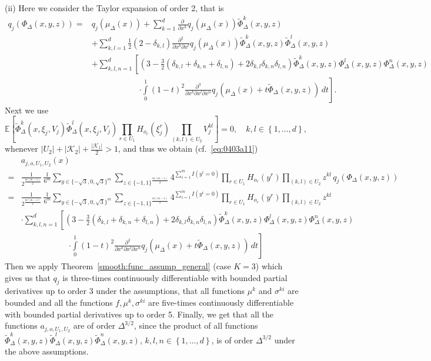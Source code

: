 \documentclass[11pt,a4paper]{amsart}
\theoremstyle{plain}
\theoremstyle{definition}
\theoremstyle{remark}
\numberwithin{equation}{section}
\newcommand*{\EE}{\mathbb E}
\begin{document}
(ii) Here we consider the Taylor expansion of order 2, that is
\begin{align*}
q_j(\Phi_\Delta(x,y,z))=&q_j(\mu_\Delta(x))+\sum_{k=1}^d\frac{\partial}{\partial x^k}q_j(\mu_\Delta(x))\tilde\Phi_\Delta^k(x,y,z)\\
&+\sum_{k,l=1}^d\frac{1}{2}(2-\delta_{k,l})\frac{\partial^2}{\partial x^k\partial x^l}q_j(\mu_\Delta(x))\tilde\Phi_\Delta^k(x,y,z)\tilde\Phi_\Delta^l(x,y,z)\\
&+\sum_{k,l,n=1}^d\left[\left(3-\frac{3}{2}\left(\delta_{k,l}+\delta_{k,n}+\delta_{l,n}\right)+2\delta_{k,l}\delta_{k,n}\delta_{l,n}\right)\tilde\Phi_\Delta^k(x,y,z)\Phi_\Delta^l(x,y,z)\Phi_\Delta^n(x,y,z)\right.\\
&\phantom{+\sum_{k,l,n=1}^d\left[\right.}\left.
\cdot\int\limits_0^1(1-t)^2\frac{\partial^3}{\partial x^k\partial x^l\partial x^n}q_j(\mu_\Delta(x)+t\tilde\Phi_\Delta(x,y,z))\,dt\right].
\end{align*}
Next we use 
$$\EE\left[\tilde\Phi_\Delta^k(x,\xi_j,V_j)\tilde\Phi_\Delta^l(x,\xi_j,V_j)\prod_{r\in U_1} H_{o_r}(\xi_j^r)
\prod_{(k,l)\in U_2} V_j^{kl}\right]=0,\quad k,l\in\left\{1,\ldots,d\right\},$$
whenever $\left|U_2\right|+\left|\mathcal{K}_2\right|+\frac{\left|\mathcal{K}_1\right|}{2}>1$, and thus we obtain (cf.~\eqref{eq:0403a11})
\begin{align*}
&a_{j,o,U_1,U_2}(x)\\
=&\frac{1}{2^{\frac{m(m-1)}{2}}}\,\frac{1}{6^{m}}\sum_{y\in\{-\sqrt{3},0,\sqrt{3}\}^{m}}\sum_{z\in\{-1,1\}^{\frac{m(m-1)}{2}}} 4^{\sum_{i=1}^{m}I(y^{i}=0)}
\prod_{r\in U_1}H_{o_r}(y^r)
\prod_{(k,l)\in U_2}z^{kl}\,
q_j(\Phi_\Delta(x,y,z))\\
=&\frac{1}{2^{\frac{m(m-1)}{2}}}\,\frac{1}{6^{m}}\sum_{y\in\{-\sqrt{3},0,\sqrt{3}\}^{m}}\sum_{z\in\{-1,1\}^{\frac{m(m-1)}{2}}} 4^{\sum_{i=1}^{m}I(y^{i}=0)}
\prod_{r\in U_1}H_{o_r}(y^r)
\prod_{(k,l)\in U_2}z^{kl}\\
&\cdot\sum_{k,l,n=1}^d\left[\left(3-\frac{3}{2}\left(\delta_{k,l}+\delta_{k,n}+\delta_{l,n}\right)+2\delta_{k,l}\delta_{k,n}\delta_{l,n}\right)\tilde\Phi_\Delta^k(x,y,z)\Phi_\Delta^l(x,y,z)\Phi_\Delta^n(x,y,z)\right.\\
&\phantom{+\sum_{k,l,n=1}^d\left[\right.}\left.
\cdot\int\limits_0^1(1-t)^2\frac{\partial^3}{\partial x^k\partial x^l\partial x^n}q_j(\mu_\Delta(x)+t\tilde\Phi_\Delta(x,y,z))\,dt\right]
\end{align*}
Then we apply Theorem~\ref{smooth:func_assump_general} (case $K=3$) which gives us that $q_j$ is three-times continuously differentiable with bounded partial derivatives up to order 3 under the assumptions, that all functions $\mu^k$ and $\sigma^{ki}$ are bounded and all the functions $f,\mu^k,\sigma^{ki}$ are five-times continuously differentiable with bounded partial derivatives up to order 5. Finally, we get that all the functions $a_{j,o,U_1,U_2}$ are of order $\Delta^{3/2}$, since the product of all functions $\tilde\Phi_\Delta^k(x,y,z)\tilde\Phi_\Delta^l(x,y,z)\tilde\Phi_\Delta^n(x,y,z)$, $k,l,n\in\left\{1,\ldots,d\right\}$, is of order $\Delta^{3/2}$ under the above assumptions.
\end{document}
